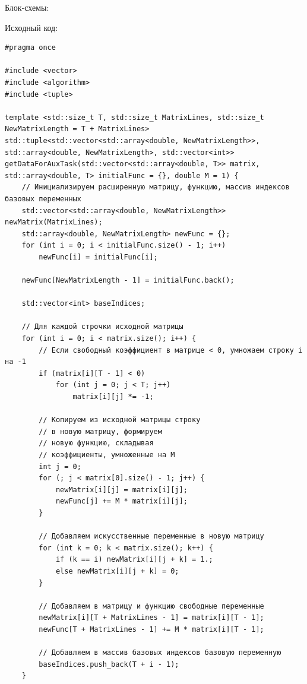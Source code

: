 \documentclass[a4paper,14pt]{extarticle}
\begin{document}
Блок-схемы:
\begin{center}
    \bigbreak
    \bigbreak
    
\end{center}
Исходный код:
\begin{verbatim}
#pragma once

#include <vector>
#include <algorithm>
#include <tuple>

template <std::size_t T, std::size_t MatrixLines, std::size_t NewMatrixLength = T + MatrixLines>
std::tuple<std::vector<std::array<double, NewMatrixLength>>, std::array<double, NewMatrixLength>, std::vector<int>>
getDataForAuxTask(std::vector<std::array<double, T>> matrix, std::array<double, T> initialFunc = {}, double M = 1) {
    // Инициализируем расширенную матрицу, функцию, массив индексов базовых переменных
    std::vector<std::array<double, NewMatrixLength>> newMatrix(MatrixLines);
    std::array<double, NewMatrixLength> newFunc = {};
    for (int i = 0; i < initialFunc.size() - 1; i++)
        newFunc[i] = initialFunc[i];
    
    newFunc[NewMatrixLength - 1] = initialFunc.back();

    std::vector<int> baseIndices;

    // Для каждой строчки исходной матрицы
    for (int i = 0; i < matrix.size(); i++) {
        // Если свободный коэффициент в матрице < 0, умножаем строку i на -1
        if (matrix[i][T - 1] < 0)
            for (int j = 0; j < T; j++)
                matrix[i][j] *= -1;

        // Копируем из исходной матрицы строку
        // в новую матрицу, формируем 
        // новую функцию, складывая 
        // коэффициенты, умноженные на M
        int j = 0;
        for (; j < matrix[0].size() - 1; j++) {
            newMatrix[i][j] = matrix[i][j];
            newFunc[j] += M * matrix[i][j];
        }
        
        // Добавляем искусственные переменные в новую матрицу
        for (int k = 0; k < matrix.size(); k++) {
            if (k == i) newMatrix[i][j + k] = 1.;
            else newMatrix[i][j + k] = 0;
        }

        // Добавляем в матрицу и функцию свободные переменные
        newMatrix[i][T + MatrixLines - 1] = matrix[i][T - 1];
        newFunc[T + MatrixLines - 1] += M * matrix[i][T - 1];

        // Добавляем в массив базовых индексов базовую переменную
        baseIndices.push_back(T + i - 1);
    }


\end{verbatim}
\end{document}
